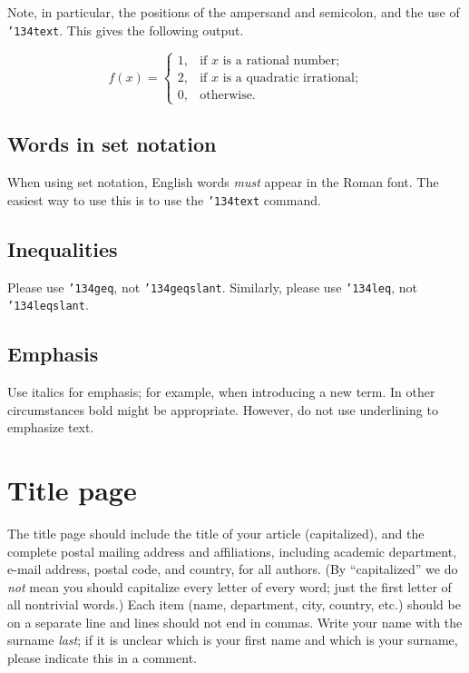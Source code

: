 \documentclass[12pt]{article}
\begin{document}
\medskip

Note, in particular, the positions of the ampersand and semicolon,
and the use of {\tt \char'134text}.  This gives the following output.

\begin{displaymath}
f(x) = \begin{cases}
	1, & \text{if $x$ is a rational number;} \\
	2, & \text{if $x$ is a quadratic irrational;} \\ 
	0, & \text{otherwise.}
	\end{cases}
\end{displaymath}


\subsection{Words in set notation}

When using set notation, English words 
{\it must\/} appear in the Roman font.
The easiest way to use this is to use the {\tt \char'134text} command.

\subsection{Inequalities}

Please use {\tt \char'134geq}, not {\tt \char'134geqslant}.  Similarly,
please use {\tt \char'134leq}, not {\tt \char'134leqslant}.

\subsection{Emphasis}
Use italics for emphasis; for example, when introducing a new term.
In other circumstances bold might be appropriate.  However, do not use
underlining to emphasize text.

\section{Title page}

The title page should include the title of your article (capitalized),
and the complete postal mailing address and affiliations, including academic
department, e-mail address, postal code, and country,
for all authors.      
(By ``capitalized'' we do {\it not\/} mean you should capitalize every letter
of every word; just the first letter of all nontrivial words.)
Each item (name, department, city, country, etc.)
should be on a separate line and lines should not end in commas.
Write your name with the surname {\it last}; if it is
unclear which is your first name and which is your surname, please
indicate this in a comment.
\end{document}
